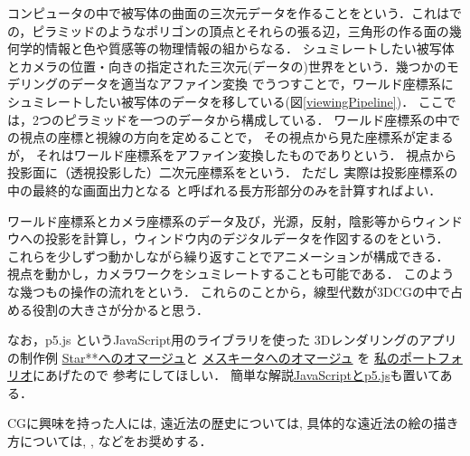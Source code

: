 コンピュータの中で被写体の曲面の三次元データを作ることをという．これはでの，ピラミッドのようなポリゴンの頂点とそれらの張る辺，三角形の作る面の幾何学的情報と色や質感等の物理情報の組からなる．
シュミレートしたい被写体とカメラの位置・向きの指定された三次元(データの)世界をという．幾つかのモデリングのデータを適当なアファイン変換%
でうつすことで，ワールド座標系にシュミレートしたい被写体のデータを移している(図\ref{viewingPipeline})．
ここでは，2つのピラミッドを一つのデータから構成している．
ワールド座標系の中での視点の座標と視線の方向を定めることで，
その視点から見た座標系が定まるが，
それはワールド座標系をアファイン変換したものでありという．
視点から投影面に（透視投影した）二次元座標系をという．
ただし
実際は投影座標系の中の最終的な画面出力となる
と呼ばれる長方形部分のみを計算すればよい．

ワールド座標系とカメラ座標系のデータ及び，光源，反射，陰影等からウィンドウへの投影を計算し，ウィンドウ内のデジタルデータを作図するのをという．
これらを少しずつ動かしながら繰り返すことでアニメーションが構成できる．
視点を動かし，カメラワークをシュミレートすることも可能である．
このような幾つもの操作の流れをという．
これらのことから，線型代数が3DCGの中で占める役割の大きさが分かると思う．

なお，p5.js というJavaScript用のライブラリを使った
3Dレンダリングのアプリの制作例
\href{https://snow00two.github.io/spaceInvApp/}{Star**へのオマージュ}と
\href{https://snow00two.github.io/homMezquitaApp/}{メスキータへのオマージュ}
を
\href{https://snow00two.github.io/mySite/}{私のポートフォリオ}にあげたので
参考にしてほしい．
簡単な解説\href{https://snow00two.github.io/docs/JavaScriptGitHub.pdf}{JavaScriptとp5.js}も置いてある．


\emptyline
CGに興味を持った人には\cite{CG}, 遠近法の歴史については\cite{D},
具体的な遠近法の絵の描き方については\cite{3DT}, \cite{RS}, \cite{RSII} などをお奨めする．

%      
%      
%      
%         

